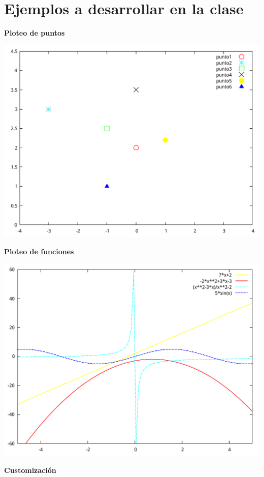 \documentclass[11.5pt,a4paper]{article}
\begin{document}
\section{Ejemplos a desarrollar en la clase}

\textbf{Ploteo de puntos}

\includegraphics[scale=0.4]{ejemplo1.pdf} 

\textbf{Ploteo de funciones}

\includegraphics[scale=0.4]{ejemplo2.pdf} 

\textbf{Customización}
\end{document}
